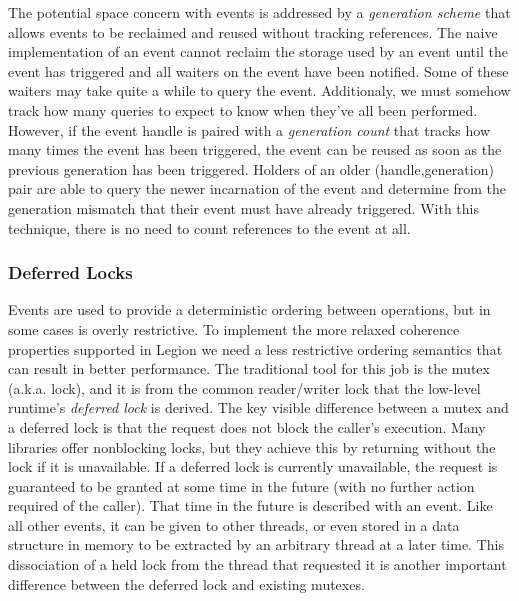 The potential space concern with events is addressed by a {\em generation scheme}
that allows events to be reclaimed and reused without tracking references.  The
naive implementation of an event cannot reclaim the storage used by an event
until the event has triggered and all waiters on the event have been
notified.  Some of these waiters may take quite a while to query the event.
Additionaly, we must somehow track how many queries to expect to know
when they've all been performed.  However, if the event handle is paired with a
{\em generation count} that tracks how many times the event has been triggered,
the event can be reused as soon as the previous generation has been triggered.
Holders of an older (handle,generation) pair are able to query the newer
incarnation of the event and determine from the generation mismatch that their
event must have already triggered.  With this technique, there is no need to
count references to the event at all. 

\subsubsection{Deferred Locks}
\label{subsec:defferedlocks}
Events are used to provide a deterministic ordering between operations, but in
some cases is overly restrictive.  To implement the more relaxed coherence
properties supported in Legion we need a less restrictive ordering semantics that
can result in better performance.  The traditional tool for this job is
the mutex (a.k.a. lock), and it is from the common reader/writer lock that
the low-level runtime's {\em deferred lock} is derived.  The key visible 
difference between a mutex and a deferred lock is that the request does not
block the caller's execution.  Many libraries offer nonblocking locks, but
they achieve this by returning without the lock if it is unavailable.  If
a deferred lock is currently unavailable, the request is guaranteed to be
granted at some time in the future (with no further action required of the 
caller).  That time in the future is described with an event.  Like all other
events, it can be given to other threads, or even stored
in a data structure in memory to be extracted by an arbitrary thread at a 
later time.  This dissociation of a held lock from the thread that
requested it is another important difference between the deferred lock and
existing mutexes.

